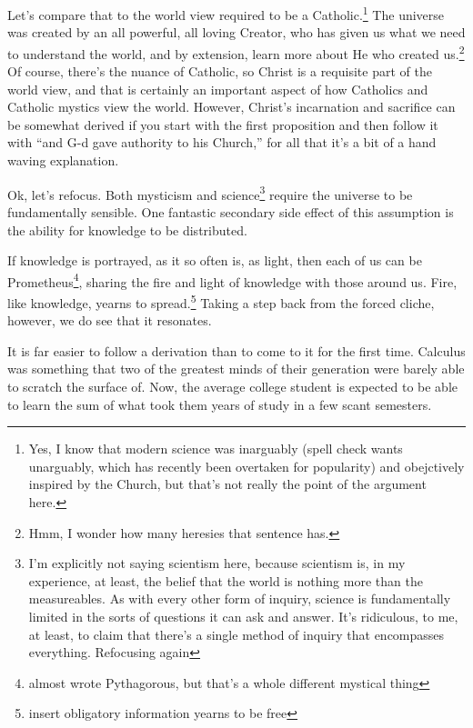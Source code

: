 \documentclass[12pt]{article}[titlepage]
\newcommand{\say}[1]{``#1''}
\renewcommand{\,}{\textsuperscript{,}}
\begin{document}
Let's compare that to the world view required to be a Catholic.\footnote{Yes, I know that modern science was inarguably (spell check wants unarguably, which has recently been overtaken for popularity) and obejctively inspired by the Church, but that's not really the point of the argument here.}
The universe was created by an all powerful, all loving Creator, who has given us what we need to understand the world, and by extension, learn more about He who created us.\footnote{Hmm, I wonder how many heresies that sentence has.}
Of course, there's the nuance of Catholic, so Christ is a requisite part of the world view, and that is certainly an important aspect of how Catholics and Catholic mystics view the world.
However, Christ's incarnation and sacrifice can be somewhat derived if you start with the first proposition and then follow it with \say{and G-d gave authority to his Church,} for all that it's a bit of a hand waving explanation.

Ok, let's refocus.
Both mysticism and science\footnote{I'm explicitly not saying scientism here, because scientism is, in my experience, at least, the belief that the world is nothing more than the measureables.
As with every other form of inquiry, science is fundamentally limited in the sorts of questions it can ask and answer.
It's ridiculous, to me, at least, to claim that there's a single method of inquiry that encompasses everything.
Refocusing again} require the universe to be fundamentally sensible.
One fantastic secondary side effect of this assumption is the ability for knowledge to be distributed.

If knowledge is portrayed, as it so often is, as light, then each of us can be Prometheus\footnote{almost wrote Pythagorous, but that's a whole different mystical thing}, sharing the fire and light of knowledge with those around us.
Fire, like knowledge, yearns to spread.\footnote{insert obligatory information yearns to be free}
Taking a step back from the forced cliche, however, we do see that it resonates.

It is far easier to follow a derivation than to come to it for the first time.
Calculus was something that two of the greatest minds of their generation were barely able to scratch the surface of.
Now, the average college student is expected to be able to learn the sum of what took them years of study in a few scant semesters.
\end{document}
